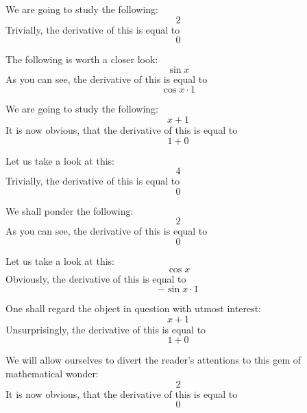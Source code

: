 \documentclass{article}
\begin{document}
We are going to study the following:
\begin{equation}
2 
\end{equation}
Trivially, the derivative of this is equal to
\begin{equation}
0 
\end{equation}

The following is worth a closer look:
\begin{equation}
\sin x 
\end{equation}
As you can see, the derivative of this is equal to
\begin{equation}
\cos x \cdot 1 
\end{equation}

We are going to study the following:
\begin{equation}
x + 1 
\end{equation}
It is now obvious, that the derivative of this is equal to
\begin{equation}
1 + 0 
\end{equation}

Let us take a look at this:
\begin{equation}
4 
\end{equation}
Trivially, the derivative of this is equal to
\begin{equation}
0 
\end{equation}

We shall ponder the following:
\begin{equation}
2 
\end{equation}
As you can see, the derivative of this is equal to
\begin{equation}
0 
\end{equation}

Let us take a look at this:
\begin{equation}
\cos x 
\end{equation}
Obviously, the derivative of this is equal to
\begin{equation}
-\sin x \cdot 1 
\end{equation}

One shall regard the object in question with utmost interest:
\begin{equation}
x + 1 
\end{equation}
Unsurprisingly, the derivative of this is equal to
\begin{equation}
1 + 0 
\end{equation}

We will allow ourselves to divert the reader's attentions to this gem of mathematical wonder:
\begin{equation}
2 
\end{equation}
It is now obvious, that the derivative of this is equal to
\begin{equation}
0 
\end{equation}
\end{document}
